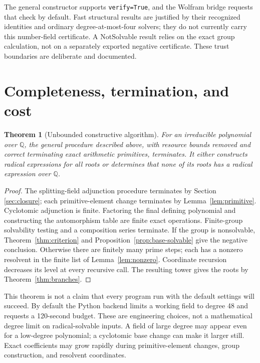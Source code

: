\documentclass[11pt,a4paper]{article}
\newtheorem{theorem}{Theorem}[section]
\theoremstyle{definition}
\theoremstyle{remark}
\newcommand{\Q}{\mathbb Q}
\newcommand{\code}[1]{\texttt{#1}}
\newcommand{\status}[1]{\textsf{#1}}
\begin{document}
The general constructor supports \code{verify=True}, and the Wolfram bridge
requests that check by default. Fast structural results are justified by their
recognized identities and ordinary degree-at-most-four solvers; they do not
currently carry this number-field certificate. A \status{NotSolvable} result
relies on the exact group calculation, not on a separately exported negative
certificate. These trust boundaries are deliberate and documented.

\section{Completeness, termination, and cost}
\label{sec:complete}
\begin{theorem}[Unbounded constructive algorithm]\label{thm:complete}
For an irreducible polynomial over $\Q$, the general procedure described above,
with resource bounds removed and correct terminating exact arithmetic
primitives, terminates. It either constructs radical expressions for all roots
or determines that none of its roots has a radical expression over $\Q$.
\end{theorem}
\begin{proof}
The splitting-field adjunction procedure terminates by Section
\ref{sec:closure}; each primitive-element change terminates by
Lemma~\ref{lem:primitive}. Cyclotomic adjunction is finite. Factoring the final
defining polynomial and constructing the automorphism table are finite exact
operations. Finite-group solvability testing and a composition series terminate.
If the group is nonsolvable, Theorem~\ref{thm:criterion} and
Proposition~\ref{prop:base-solvable} give the negative conclusion. Otherwise
there are finitely many prime steps; each has a nonzero resolvent in the finite
list of Lemma~\ref{lem:nonzero}. Coordinate recursion decreases its level at
every recursive call. The resulting tower gives the roots by
Theorem~\ref{thm:branches}.
\end{proof}

This theorem is not a claim that every program run with the default settings
will succeed. By default the Python backend limits a working field to degree
48 and requests a 120-second budget. These are engineering choices, not a
mathematical degree limit on radical-solvable inputs. A field of large degree
may appear even for a low-degree polynomial; a cyclotomic base change can make
it larger still. Exact coefficients may grow rapidly during primitive-element
changes, group construction, and resolvent coordinates.
\end{document}
